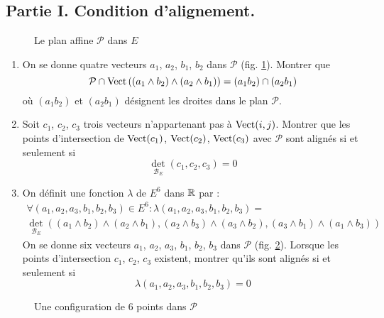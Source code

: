 \subsection*{Partie I. Condition d'alignement.}
\begin{figure}[ht]
 \centering
 
 \caption{Le plan affine $\mathcal{P}$ dans $E$}
 \label{fig:EhexaP_1}
\end{figure}
\begin{enumerate}
 \item On se donne quatre vecteurs $a_1$, $a_2$, $b_1$, $b_2$ dans $\mathcal P$ (fig. \ref{fig:EhexaP_1}). Montrer que 
\begin{displaymath}
 \mathcal P \cap \operatorname{Vect}\left((a_1\wedge b_2)\wedge(a_2\wedge b_1)\right) 
 = (a_1 b_2)\cap (a_2b_1)
\end{displaymath}
où $(a_1 b_2)$ et $(a_2b_1)$ désignent les droites dans le plan $\mathcal P$.
\item Soit $c_1$, $c_2$, $c_3$ trois vecteurs n'appartenant pas à $\operatorname{Vect}(i,j)$. Montrer que les points d'intersection de $\operatorname{Vect}(c_1)$, $\operatorname{Vect}(c_2)$, $\operatorname{Vect}(c_3)$ avec $\mathcal P$ sont alignés si et seulement si 
\begin{displaymath}
 \det_{\mathcal B_E}(c_1,c_2,c_3)=0
\end{displaymath}

\item On définit une fonction $\lambda$ de $E^6$ dans $\mathbb{R}$ par :
\begin{multline*}
 \forall (a_1,a_2,a_3,b_1,b_2,b_3) \in E^6 :
\lambda(a_1,a_2,a_3,b_1,b_2,b_3)=\\
\det_{\mathcal B_E}\left(
(a_1\wedge b_2)\wedge(a_2\wedge b_1),
(a_2\wedge b_3)\wedge(a_3\wedge b_2),
(a_3\wedge b_1)\wedge(a_1\wedge b_3)
\right)
\end{multline*}
On se donne six vecteurs $a_1$, $a_2$, $a_3$, $b_1$, $b_2$, $b_3$ dans $\mathcal P$ (fig. \ref{fig:EhexaP_2}). Lorsque les points d'intersection $c_1$, $c_2$, $c_3$ existent, montrer qu'ils sont alignés si et seulement si 
\begin{displaymath}
 \lambda(a_1,a_2,a_3,b_1,b_2,b_3)=0
\end{displaymath}
\end{enumerate}
\begin{figure}[ht]
 \centering
 
 \caption{Une configuration de $6$ points dans $\mathcal{P}$}
 \label{fig:EhexaP_2}
\end{figure}
